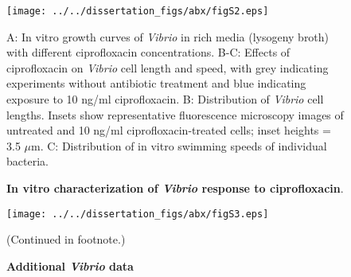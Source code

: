 
\begin{figure}[H]
	\centerline{
		\texttt{[image: ../../dissertation\_figs/abx/figS2.eps]}}
	\caption{\textbf{In vitro characterization of \textit{Vibrio} response to ciprofloxacin}.}{A: In vitro growth curves of \textit{Vibrio} in rich media (lysogeny broth) with different ciprofloxacin concentrations. B-C: Effects of ciprofloxacin on \textit{Vibrio} cell length and speed, with grey indicating experiments without antibiotic treatment and blue indicating exposure to 10 ng/ml ciprofloxacin. B: Distribution of \textit{Vibrio} cell lengths. Insets show representative fluorescence microscopy images of untreated and 10 ng/ml ciprofloxacin-treated cells; inset heights = 3.5 $\mu$m. C: Distribution of in vitro swimming speeds of individual bacteria.}
\end{figure}


	 

\begin{figure}[H]
	\centerline{
		\texttt{[image: ../../dissertation\_figs/abx/figS3.eps]}}
	\caption{\textbf{Additional \textit{Vibrio} data}}{(Continued in footnote.)}
	\label{fig:figS3}
\end{figure}

